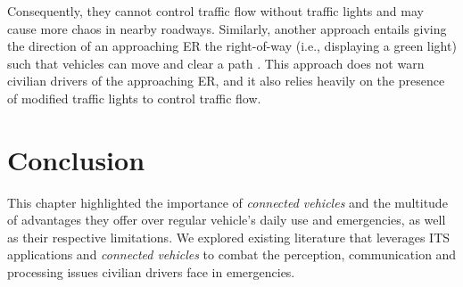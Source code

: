 Consequently, they cannot control traffic flow without traffic lights and may cause more chaos in nearby roadways. Similarly, another approach entails giving the direction of an approaching \acrshort{ER} the right-of-way (i.e., displaying a green light) such that vehicles can move and clear a path \cite{Buchenscheit2009}. This approach does not warn civilian drivers of the approaching \acrshort{ER}, and it also relies heavily on the presence of modified traffic lights to control traffic flow.

\section{Conclusion}
This chapter highlighted the importance of \textit{connected vehicles} and the multitude of advantages they offer over regular vehicle's daily use and emergencies, as well as their respective limitations. We explored existing literature that leverages \acrshort{ITS} applications and \textit{connected vehicles} to combat the perception, communication and processing issues civilian drivers face in emergencies.